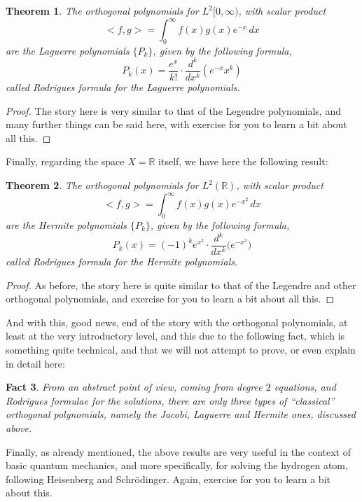 \documentclass[12pt]{amsbook}
\newtheorem{theorem}{Theorem}[chapter]
\newtheorem{fact}[theorem]{Fact}
\begin{document}
\begin{theorem}
The orthogonal polynomials for $L^2[0,\infty)$, with scalar product
$$<f,g>=\int_0^\infty f(x)g(x)e^{-x}\,dx$$
are the Laguerre polynomials $\{P_k\}$, given by the following formula,
$$P_k(x)=\frac{e^x}{k!}\cdot\frac{d^k}{dx^k}\left(e^{-x}x^k\right)$$
called Rodrigues formula for the Laguerre polynomials.
\end{theorem}

\begin{proof}
The story here is very similar to that of the Legendre polynomials, and many further things can be said here, with exercise for you to learn a bit about all this.
\end{proof}

Finally, regarding the space $X=\mathbb R$ itself, we have here the following result:


\begin{theorem}
The orthogonal polynomials for $L^2(\mathbb R)$, with scalar product
$$<f,g>=\int_0^\infty f(x)g(x)e^{-x^2}\,dx$$
are the Hermite polynomials $\{P_k\}$, given by the following formula,
$$P_k(x)=(-1)^k e^{x^2}\cdot\frac{d^k}{dx^k}\big(e^{-x^2}\big)$$
called Rodrigues formula for the Hermite polynomials.
\end{theorem}

\begin{proof}
As before, the story here is quite similar to that of the Legendre and other orthogonal polynomials, and exercise for you to learn a bit about all this.
\end{proof}

And with this, good news, end of the story with the orthogonal polynomials, at least at the very introductory level, and this due to the following fact, which is something quite technical, and that we will not attempt to prove, or even explain in detail here:

\begin{fact}
From an abstract point of view, coming from degree $2$ equations, and Rodrigues formulae for the solutions, there are only three types of ``classical'' orthogonal polynomials, namely the Jacobi, Laguerre and Hermite ones, discussed above.
\end{fact}

Finally, as already mentioned, the above results are very useful in the context of basic quantum mechanics, and more specifically, for solving the hydrogen atom, following Heisenberg and Schr\"odinger. Again, exercise for you to learn a bit about this.
\end{document}
